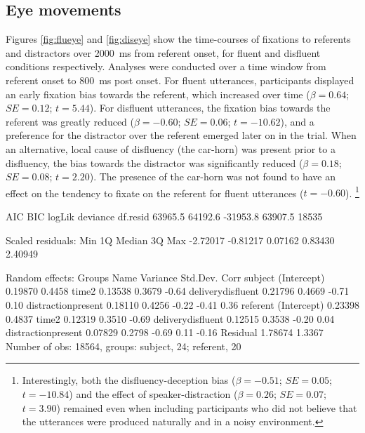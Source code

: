 \documentclass[a4paper,man,natbib]{apa6}
\newcommand*{\SE}{\mathit{SE}} %
\begin{document}

\subsection{Eye movements}
Figures \ref{fig:flueye} and \ref{fig:diseye} show the time-courses of fixations to referents and distractors over 2000~ms from referent onset, for fluent and disfluent conditions respectively.
Analyses were conducted over a time window from referent onset to 800~ms post onset.
For fluent utterances, participants displayed an early fixation bias towards the referent, which increased over time ($\beta = 0.64$; $\SE = 0.12$; $t=5.44$). 
For disfluent utterances, the fixation bias towards the referent was greatly reduced ($\beta = -0.60$; $\SE = 0.06$; $t=-10.62$), and a preference for the distractor over the referent emerged later on in the trial.
When an alternative, local cause of disfluency (the car-horn) was present prior to a disfluency, the bias towards the distractor was significantly reduced ($\beta = 0.18$; $\SE = 0.08$; $t=2.20$).
The presence of the car-horn was not found to have an effect on the tendency to fixate on the referent for fluent utterances ($t=-0.60$).
\footnote{Interestingly, both the disfluency-deception bias ($\beta = -0.51$; $\SE = 0.05$; $t=-10.84$) and the effect of speaker-distraction ($\beta = 0.26$; $\SE = 0.07$; $t=3.90$) remained even when including participants who did not believe that the utterances were produced naturally and in a noisy environment.}

\iffalse
     AIC      BIC   logLik deviance df.resid 
 63965.5  64192.6 -31953.8  63907.5    18535 

Scaled residuals: 
     Min       1Q   Median       3Q      Max 
-2.72017 -0.81217  0.07162  0.83430  2.40949 

Random effects:
 Groups   Name               Variance Std.Dev. Corr             
 subject  (Intercept)        0.19870  0.4458                    
          time2              0.13538  0.3679   -0.64            
          deliverydisfluent  0.21796  0.4669   -0.71  0.10      
          distractionpresent 0.18110  0.4256   -0.22 -0.41  0.36
 referent (Intercept)        0.23398  0.4837                    
          time2              0.12319  0.3510   -0.69            
          deliverydisfluent  0.12515  0.3538   -0.20  0.04      
          distractionpresent 0.07829  0.2798   -0.69  0.11 -0.16
 Residual                    1.78674  1.3367                    
Number of obs: 18564, groups:  subject, 24; referent, 20
\end{document}
